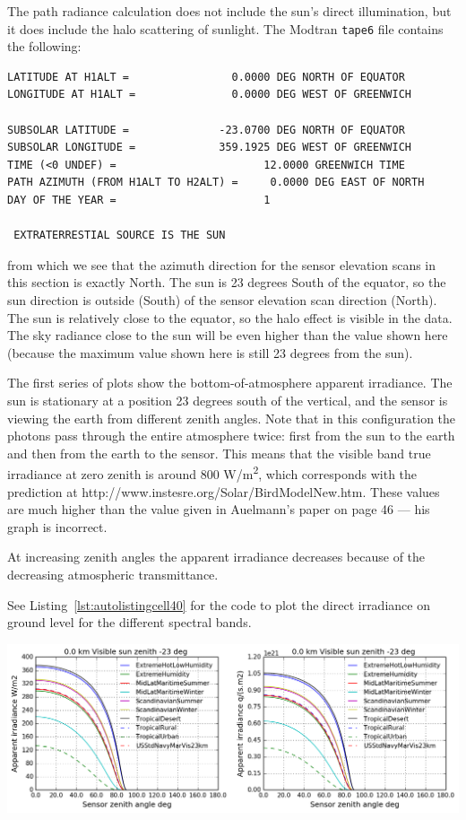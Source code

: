 \documentclass{workpackage}
\begin{document}
The path radiance calculation does not include the sun's direct illumination, but it does include the halo scattering of sunlight.  The Modtran \verb+tape6+ file contains the following:


\begin{verbatim}
LATITUDE AT H1ALT =                0.0000 DEG NORTH OF EQUATOR
LONGITUDE AT H1ALT =               0.0000 DEG WEST OF GREENWICH

SUBSOLAR LATITUDE =              -23.0700 DEG NORTH OF EQUATOR
SUBSOLAR LONGITUDE =             359.1925 DEG WEST OF GREENWICH
TIME (<0 UNDEF) =                       12.0000 GREENWICH TIME
PATH AZIMUTH (FROM H1ALT TO H2ALT) =     0.0000 DEG EAST OF NORTH
DAY OF THE YEAR =                       1

 EXTRATERRESTIAL SOURCE IS THE SUN
\end{verbatim}


from which we see that the azimuth direction for the sensor elevation scans  in this section is  exactly North.  The sun is 23 degrees South of the equator, so the sun direction is outside (South) of the sensor elevation scan direction (North).   The sun is relatively close to the equator, so the halo effect is visible in the data.  The sky radiance close to the sun will be even higher than the value shown here (because the maximum value shown here is still 23 degrees from the sun).


The first series of plots show the bottom-of-atmosphere apparent irradiance.  The sun is stationary at a position 23 degrees south of the vertical, and the sensor is viewing the earth  from different zenith angles.  Note that in this configuration the photons pass through the entire atmosphere twice: first from the sun to the earth and then from the earth to the sensor.  This means that the visible band true irradiance at zero  zenith is around 800 W/m\textsuperscript{2}, which corresponds with the prediction at http://www.instesre.org/Solar/BirdModelNew.htm.  These values are much higher than the value given in Auelmann's paper on page 46 --- his graph is incorrect.

At increasing zenith angles the apparent irradiance decreases because of the decreasing atmospheric transmittance. 

See Listing~\ref{lst:autolistingcell40} for the code to plot the direct irradiance on ground level for the different spectral bands.

\begin{center}
\includegraphics{./pic/Analyse-Standard-Atmospheres_40_0.png}
\end{center}
\end{document}
